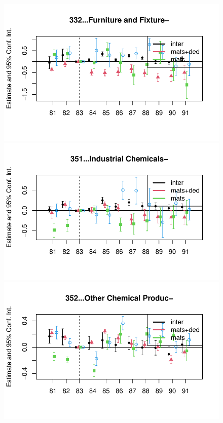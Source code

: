 \documentclass[
  12pt]{article}
\theoremstyle{definition}
\theoremstyle{remark}
\begin{document}
\begin{figure}
\begin{minipage}{\linewidth}
\includegraphics{Tax-Prod_files/figure-pdf/unnamed-chunk-12-13.pdf}

\includegraphics{Tax-Prod_files/figure-pdf/unnamed-chunk-12-14.pdf}

\includegraphics{Tax-Prod_files/figure-pdf/unnamed-chunk-12-15.pdf}


\end{minipage}
\end{figure}
\end{document}
